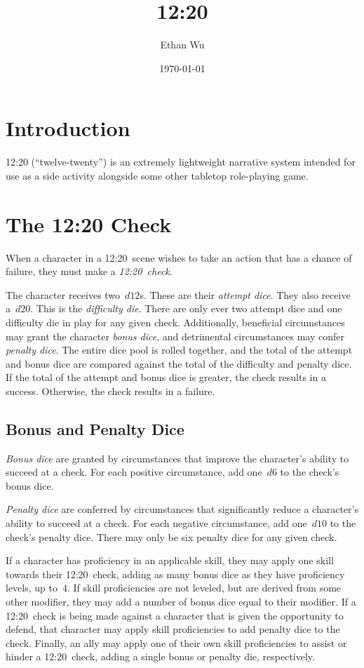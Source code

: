 \documentclass[twocolumn]{article}
\title{12:20}
\author{Ethan Wu}
\date{\today}
\begin{document}
\maketitle

\section{Introduction}
12:20 (``twelve-twenty'') is an extremely lightweight narrative system intended
for use as a side activity alongside some other tabletop role-playing game.

\section{The 12:20 Check}
When a character in a 12:20~scene wishes to take an action that has a chance of
failure, they must make a \emph{12:20~check}.

The character receives two~$d12$s. These are their \emph{attempt dice}. They
also receive a~$d20$. This is the \emph{difficulty die}. There are only ever
two attempt dice and one difficulty die in play for any given check.
Additionally, beneficial circumstances may grant the character \emph{bonus
dice}, and detrimental circumstances may confer \emph{penalty dice}. The
entire dice pool is rolled together, and the total of the attempt and bonus dice
are compared against the total of the difficulty and penalty dice. If the total
of the attempt and bonus dice is greater, the check results in a success.
Otherwise, the check results in a failure.

\subsection{Bonus and Penalty Dice}
\emph{Bonus dice} are granted by circumstances that improve the character's
ability to succeed at a check. For each positive circumstance, add one~$d6$ to
the check's bonus dice.

\emph{Penalty dice} are conferred by circumstances that significantly reduce a
character's ability to succeed at a check. For each negative circumstance, add
one~$d10$ to the check's penalty dice. There may only be six penalty dice for
any given check.

If a character has proficiency in an applicable skill, they may apply one skill
towards their 12:20~check, adding as many bonus dice as they have proficiency
levels, up to~4. If skill proficiencies are not leveled, but are derived from
some other modifier, they may add a number of bonus dice equal to their
modifier. If a 12:20~check is being made against a character that is given the
opportunity to defend, that character may apply skill proficiencies to add
penalty dice to the check. Finally, an ally may apply one of their own skill
proficiencies to assist or hinder a 12:20~check, adding a single bonus or
penalty die, respectively.
\end{document}
